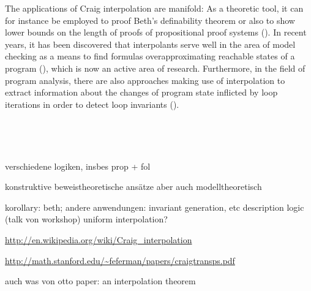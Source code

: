 The applications of Craig interpolation are manifold:
As a theoretic tool, it can for instance be employed to proof Beth's definability theorem or also to show lower bounds on the length of proofs of propositional proof systems (\cite{Pudlak97,krajivcek1997interpolation}).
In recent years, it has been discovered that interpolants serve well in the area of model checking as a means to find formulas overapproximating reachable states of a program (\cite{McMillan03}), which is now an active area of research.
Furthermore, in the field of program analysis, there are also approaches making use of interpolation to extract information about the changes of program state inflicted by loop iterations in order to detect loop invariants  (\cite{weissenbacher2010}).







~

~

verschiedene logiken, insbes prop + fol

konstruktive beweistheoretische ansätze aber auch modelltheoretisch

korollary: beth; andere anwendungen: invariant generation, etc
description logic (talk von workshop)
uniform interpolation?

\url{http://en.wikipedia.org/wiki/Craig_interpolation}

\url{http://math.stanford.edu/~feferman/papers/craigtransps.pdf}

auch was von otto paper: an interpolation theorem
